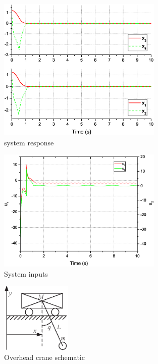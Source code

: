 \documentclass[3p]{elsarticle}
\theoremstyle{plain}
\theoremstyle{remark}
\begin{document}
\begin{figure}[http]
\centering
\includegraphics[width=0.7\textwidth]{paper3_fig2_20161108.eps}
\caption{system response}
\label{Figure:2_20161108}
\end{figure}

\begin{figure}[http]
\centering
\includegraphics[width=0.7\textwidth]{paper3_fig3.eps}
\caption{System inputs}
\label{Figure:3}
\end{figure}
\begin{figure}[http]
\centering
\includegraphics[width=0.3\textwidth]{paper3_fig8.eps}
\caption{Overhead crane schematic}
\label{Figure:8}
\end{figure}
\end{document}
